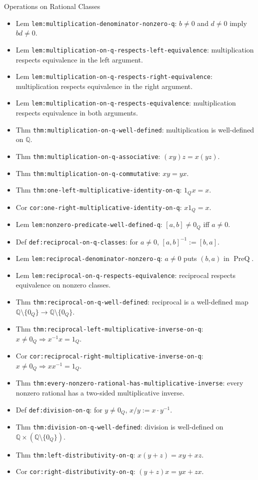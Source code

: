 \begin{topicbox}{Operations on Rational Classes}
\begin{itemize}
  \item Lem \texttt{lem:multiplication-denominator-nonzero-q}: $b\ne0$ and $d\ne0$ imply $bd\ne0$.
  \item Lem \texttt{lem:multiplication-on-q-respects-left-equivalence}: multiplication respects equivalence in the left argument.
  \item Lem \texttt{lem:multiplication-on-q-respects-right-equivalence}: multiplication respects equivalence in the right argument.
  \item Lem \texttt{lem:multiplication-on-q-respects-equivalence}: multiplication respects equivalence in both arguments.
  \item Thm \texttt{thm:multiplication-on-q-well-defined}: multiplication is well-defined on $\mathbb{Q}$.
  \item Thm \texttt{thm:multiplication-on-q-associative}: $(xy)z=x(yz)$.
  \item Thm \texttt{thm:multiplication-on-q-commutative}: $xy=yx$.
  \item Thm \texttt{thm:one-left-multiplicative-identity-on-q}: $1_Qx=x$.
  \item Cor \texttt{cor:one-right-multiplicative-identity-on-q}: $x1_Q=x$.
  \item Lem \texttt{lem:nonzero-predicate-well-defined-q}: $[a,b]\ne0_Q$ iff $a\ne0$.
  \item Def \texttt{def:reciprocal-on-q-classes}: for $a\ne0$, $[a,b]^{-1}:=[b,a]$.
  \item Lem \texttt{lem:reciprocal-denominator-nonzero-q}: $a\ne0$ puts $(b,a)$ in $\operatorname{PreQ}$.
  \item Lem \texttt{lem:reciprocal-on-q-respects-equivalence}: reciprocal respects equivalence on nonzero classes.
  \item Thm \texttt{thm:reciprocal-on-q-well-defined}: reciprocal is a well-defined map $\mathbb{Q}\setminus\{0_Q\}\to\mathbb{Q}\setminus\{0_Q\}$.
  \item Thm \texttt{thm:reciprocal-left-multiplicative-inverse-on-q}: $x\ne0_Q\Rightarrow x^{-1}x=1_Q$.
  \item Cor \texttt{cor:reciprocal-right-multiplicative-inverse-on-q}: $x\ne0_Q\Rightarrow xx^{-1}=1_Q$.
  \item Thm \texttt{thm:every-nonzero-rational-has-multiplicative-inverse}: every nonzero rational has a two-sided multiplicative inverse.
  \item Def \texttt{def:division-on-q}: for $y\ne0_Q$, $x/y:=x\cdot y^{-1}$.
  \item Thm \texttt{thm:division-on-q-well-defined}: division is well-defined on $\mathbb{Q}\times(\mathbb{Q}\setminus\{0_Q\})$.
  \item Thm \texttt{thm:left-distributivity-on-q}: $x(y+z)=xy+xz$.
  \item Cor \texttt{cor:right-distributivity-on-q}: $(y+z)x=yx+zx$.
\end{itemize}
\end{topicbox}

